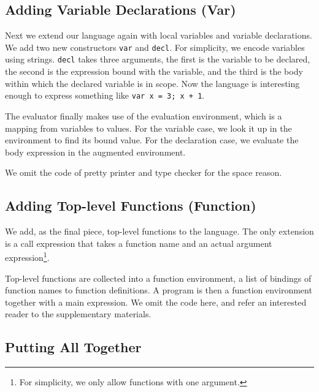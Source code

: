\subsection{Adding Variable Declarations (Var)}

Next we extend our language again with local variables and variable
declarations. We add two new constructors \lstinline{var} and \lstinline{decl}.
For simplicity, we encode variables using strings. \lstinline{decl} takes three
arguments, the first is the variable to be declared, the second is the
expression bound with the variable, and the third is the body within which the
declared variable is in scope. Now the language is interesting enough to express
something like \lstinline{var x = 3; x + 1}.

The evaluator finally makes use of the evaluation environment, which is a
mapping from variables to values.
For the variable case, we look it up in the environment to find its bound value.
For the declaration case, we evaluate the body expression in the augmented
environment.

We omit the code of pretty printer and type checker for the space reason.

\subsection{Adding Top-level Functions (Function)}

We add, as the final piece, top-level functions to the language. The only
extension is a call expression that takes a function name and an actual
argument expression\footnote{For simplicity, we only allow functions with one
  argument.}.

Top-level functions are collected into a function environment, a list of
bindings of function names to function definitions. A program is then a function
environment together with a main expression. We omit the code here, and refer an
interested reader to the supplementary materials.


\subsection{Putting All Together}

